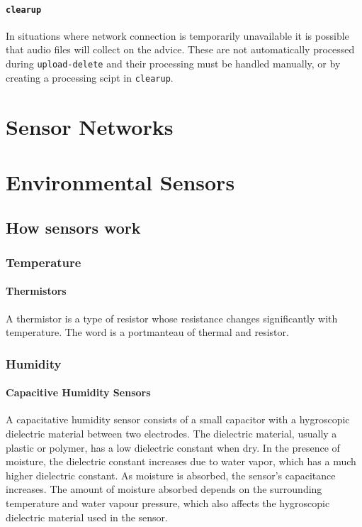 \documentclass[
]{book}
\begin{document}
\subsubsection{\texorpdfstring{\texttt{clearup}}{clearup}}\label{clearup}

In situations where network connection is temporarily unavailable it is possible that audio files will collect on the advice. These are not automatically processed during \texttt{upload-delete} and their processing must be handled manually, or by creating a processing scipt in \texttt{clearup}.

\chapter{Sensor Networks}\label{sensor-networks}

\chapter{Environmental Sensors}\label{environmental-sensors}

\section{How sensors work}\label{how-sensors-work}

\subsection{Temperature}\label{temperature}

\subsubsection{Thermistors}\label{thermistors}

A thermistor is a type of resistor whose resistance changes significantly with temperature. The word is a portmanteau of thermal and resistor.

\subsection{Humidity}\label{humidity}

\subsubsection{Capacitive Humidity Sensors}\label{capacitive-humidity-sensors}

A capacitative humidity sensor consists of a small capacitor with a hygroscopic dielectric material between two electrodes. The dielectric material, usually a plastic or polymer, has a low dielectric constant when dry. In the presence of moisture, the dielectric constant increases due to water vapor, which has a much higher dielectric constant. As moisture is absorbed, the sensor's capacitance increases. The amount of moisture absorbed depends on the surrounding temperature and water vapour pressure, which also affects the hygroscopic dielectric material used in the sensor.
\end{document}
